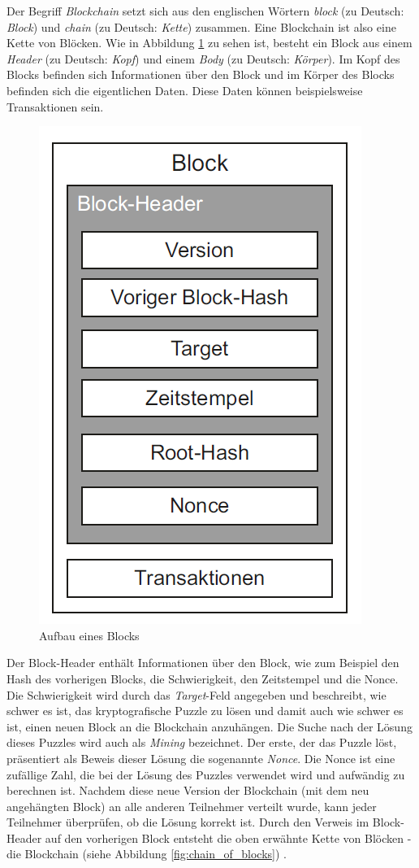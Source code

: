 Der Begriff \textit{Blockchain} setzt sich aus den englischen Wörtern \textit{block} (zu Deutsch: \textit{Block}) und \textit{chain} (zu Deutsch: \textit{Kette}) zusammen. Eine Blockchain ist also eine Kette von Blöcken. Wie in Abbildung \ref{fig:block} zu sehen ist, besteht ein Block aus einem \textit{Header} (zu Deutsch: \textit{Kopf}) und einem \textit{Body} (zu Deutsch: \textit{Körper}). Im Kopf des Blocks befinden sich Informationen über den Block und im Körper des Blocks befinden sich die eigentlichen Daten. Diese Daten können beispielsweise Transaktionen sein.

\begin{figure}[H]
    \centering
    \includegraphics[width=0.35\linewidth]{images/blockchain_block.png}
    \caption{Aufbau eines Blocks \parencite[S. 11]{Fill_BlockchainGrundlagen}}
    \label{fig:block}
\end{figure}


\noindent Der Block-Header enthält Informationen über den Block, wie zum Beispiel den Hash des vorherigen Blocks, die Schwierigkeit, den Zeitstempel und die Nonce. Die Schwierigkeit wird durch das \textit{Target}-Feld angegeben und beschreibt, wie schwer es ist, das kryptografische Puzzle zu lösen und damit auch wie schwer es ist, einen neuen Block an die Blockchain anzuhängen. Die Suche nach der Lösung dieses Puzzles wird auch als \textit{Mining} bezeichnet. Der erste, der das Puzzle löst, präsentiert als Beweis dieser Lösung die sogenannte \textit{Nonce}. Die Nonce ist eine zufällige Zahl, die bei der Lösung des Puzzles verwendet wird und aufwändig zu berechnen ist. Nachdem diese neue Version der Blockchain (mit dem neu angehängten Block) an alle anderen Teilnehmer verteilt wurde, kann jeder Teilnehmer überprüfen, ob die Lösung korrekt ist. Durch den Verweis im Block-Header auf den vorherigen Block entsteht die oben erwähnte Kette von Blöcken - die Blockchain (siehe Abbildung \ref{fig:chain_of_blocks}) \parencite[S. 10-12]{Fill_BlockchainGrundlagen}.

